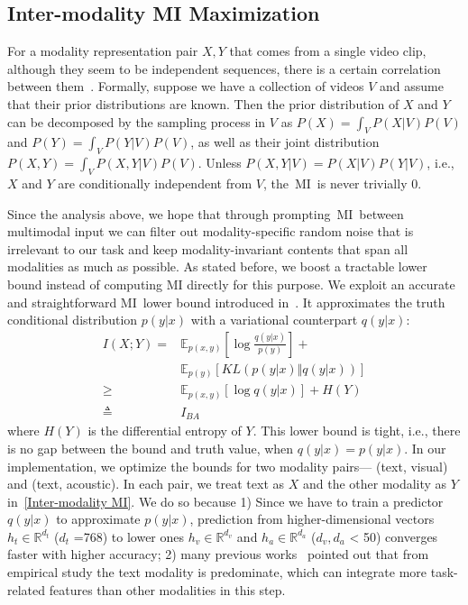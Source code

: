 \documentclass[11pt]{article}
\newcommand{\R}{\mathbb{R}}
\newcommand{\E}{\mathbb{E}}
\newcommand{\MI}{MI}
\begin{document}
\subsection{Inter-modality MI Maximization}
For a modality representation pair $X, Y$ that comes from a single video clip, although they seem to be independent sequences, there is a certain correlation between them~\cite{arandjelovic2017look}.
Formally, suppose we have a collection of videos $V$ and assume that their prior distributions are known. 
Then the prior distribution of $X$ and $Y$ can be decomposed by the sampling process in $V$ as $P(X) = \int_V P(X|V)P(V)$ and $P(Y) = \int_V P(Y|V)P(V)$, as well as their joint distribution $P(X,Y)=\int_V P(X,Y|V)P(V)$. Unless $P(X,Y|V)=P(X|V)P(Y|V)$, i.e., $X$ and $Y$ are conditionally independent from $V$, the~\MI~is never trivially 0. 
\par
Since the analysis above, we hope that through prompting~\MI~between multimodal input we can filter out modality-specific random noise that is irrelevant to our task and keep modality-invariant contents that span all modalities as much as possible.
As stated before, we boost a tractable lower bound instead of computing MI directly for this purpose.
We exploit an accurate and straightforward \MI~lower bound introduced in~\citet{agakov2004algorithm}.
It approximates the truth conditional distribution $p(y|x)$ with a variational counterpart $q(y|x)$:
\begin{equation}
\begin{aligned}
    I(X;Y) = &\E_{p(x,y)}\left[\log\frac{q(y|x)}{p(y)}\right] + \\ &\E_{p(y)}\left[KL(p(y|x)\Vert q(y|x))\right] \\ 
    \geq &\E_{p(x,y)}\left[\log q(y|x)\right]+H(Y) \\
    \triangleq &I_{BA}
\end{aligned}
\label{Inter-modality MI}
\end{equation}
where $H(Y)$ is the differential entropy of $Y$. This lower bound is tight, i.e., there is no gap between the bound and truth value, when $q(y|x)=p(y|x)$.
In our implementation, we optimize the bounds for two modality pairs--- (text, visual) and (text, acoustic). 
In each pair, we treat text as $X$ and the other modality as $Y$ in~\eqref{Inter-modality MI}. 
We do so because 1) Since we have to train a predictor $q(y|x)$ to approximate $p(y|x)$, prediction from higher-dimensional vectors $h_t\in \R^{d_t}$ ($d_t$ =768) to lower ones $h_v\in \R^{d_v}$ and $h_a\in \R^{d_a}$ ($d_v,d_a$ < 50) converges faster with higher accuracy; 2) many previous works~\citep{tsai2019multimodal,hazarika2020misa} pointed out that from empirical study the text modality is predominate, which can integrate more task-related features than other modalities in this step.
\end{document}

